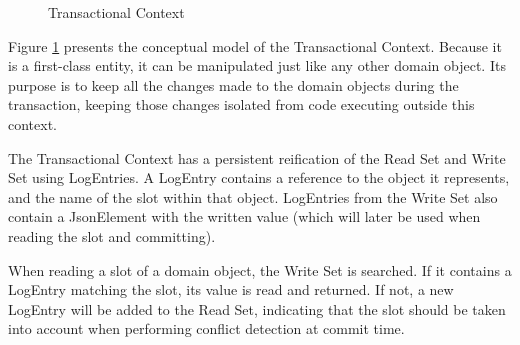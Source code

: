 \begin{figure}
  \centering

  \caption{Transactional Context}
  \label{fig:transactionalContext}

\end{figure}

Figure \ref{fig:transactionalContext} presents the conceptual model of
the Transactional Context. Because it is a first-class entity, it can
be manipulated just like any other domain object. Its purpose is to
keep all the changes made to the domain objects during the
transaction, keeping those changes isolated from code executing
outside this context.

The Transactional Context has a persistent reification of the Read Set
and Write Set using LogEntries. A LogEntry contains a reference to the
object it represents, and the name of the slot within that
object. LogEntries from the Write Set also contain a JsonElement with
the written value (which will later be used when reading the slot and
committing).

When reading a slot of a domain object, the Write Set is searched. If
it contains a LogEntry matching the slot, its value is read and
returned. If not, a new LogEntry will be added to the Read Set,
indicating that the slot should be taken into account when performing
conflict detection at commit time.

